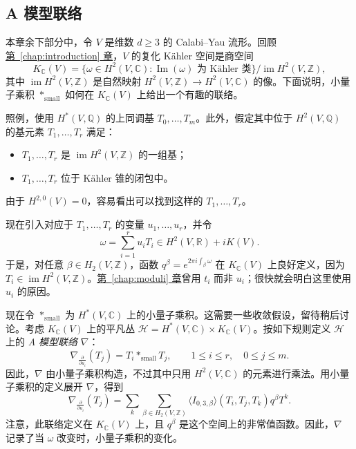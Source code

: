 \subsection{A 模型联络}\label{subsec:a-model-connection}
本章余下部分中，令 $V$ 是维数 $d\ge3$ 的 Calabi--Yau 流形。回顾\hyperref[chap:introduction]{第~\ref*{chap:introduction} 章}，$V$ 的复化 Kähler 空间是商空间
\[
K_{\mathbb C}(V)=\{\omega\in H^2(V,\mathbb C)\colon
\operatorname{Im}(\omega)\text{ 为 Kähler 类}\}/\operatorname{im}H^2(V,\mathbb Z),
\]
其中 $\operatorname{im}H^2(V,\mathbb Z)$ 是自然映射 $H^2(V,\mathbb Z)\to H^2(V,\mathbb C)$ 的像。下面说明，小量子乘积 $*_{\mathrm{small}}$ 如何在 $K_{\mathbb C}(V)$ 上给出一个有趣的联络。

照例，使用 $H^*(V,\mathbb Q)$ 的上同调基 $T_0,\ldots,T_m$。此外，假定其中位于 $H^2(V,\mathbb Q)$ 的基元素 $T_1,\ldots,T_r$ 满足：
\begin{itemize}
\item $T_1,\ldots,T_r$ 是 $\operatorname{im}H^2(V,\mathbb Z)$ 的一组基；
\item $T_1,\ldots,T_r$ 位于 Kähler 锥的闭包中。
\end{itemize}
由于 $H^{2,0}(V)=0$，容易看出可以找到这样的 $T_1,\ldots,T_r$。

现在引入对应于 $T_1,\ldots,T_r$ 的变量 $u_1,\ldots,u_r$，并令
\begin{equation}\label{eq:a-model-kahler-coordinates}
\omega=\sum_{i=1}^ru_iT_i\in H^2(V,\mathbb R)+iK(V).
\end{equation}
于是，对任意 $\beta\in H_2(V,\mathbb Z)$，函数 $q^\beta=e^{2\pi i\int_\beta\omega}$ 在 $K_{\mathbb C}(V)$ 上良好定义，因为 $T_i\in\operatorname{im}H^2(V,\mathbb Z)$。\hyperref[chap:moduli]{第~\ref*{chap:moduli} 章}曾用 $t_i$ 而非 $u_i$；很快就会明白这里使用 $u_i$ 的原因。

现在令 $*_{\mathrm{small}}$ 为 $H^*(V,\mathbb C)$ 上的小量子乘积。这需要一些收敛假设，留待稍后讨论。考虑 $K_{\mathbb C}(V)$ 上的平凡丛 $\mathcal H=H^*(V,\mathbb C)\times K_{\mathbb C}(V)$。按如下规则定义 $\mathcal H$ 上的 \emph{A 模型联络} $\nabla$：
\begin{equation}\label{eq:a-model-connection}
\nabla_{\frac{\partial}{\partial u_i}}(T_j)=T_i*_{\mathrm{small}}T_j,
\qquad 1\le i\le r,\quad0\le j\le m.
\end{equation}
因此，$\nabla$ 由小量子乘积构造，不过其中只用 $H^2(V,\mathbb C)$ 的元素进行乘法。用小量子乘积的定义展开 $\nabla$，得到
\begin{equation}\label{eq:a-model-connection-expanded}
\nabla_{\frac{\partial}{\partial u_i}}(T_j)
=\sum_k\sum_{\beta\in H_2(V,\mathbb Z)}
\langle I_{0,3,\beta}\rangle(T_i,T_j,T_k)q^\beta T^k.
\end{equation}
注意，此联络定义在 $K_{\mathbb C}(V)$ 上，且 $q^\beta$ 是这个空间上的非常值函数。因此，$\nabla$ 记录了当 $\omega$ 改变时，小量子乘积的变化。


